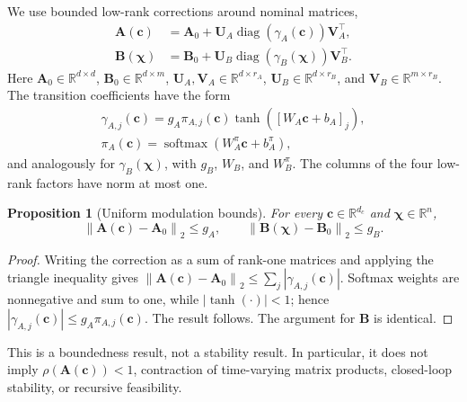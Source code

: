 ﻿\documentclass[journal]{IEEEtran}
\newtheorem{proposition}{Proposition}
\newcommand{\vc}{\mathbf{c}}
\newcommand{\vchi}{\boldsymbol{\chi}}
\newcommand{\mA}{\mathbf{A}}
\newcommand{\mB}{\mathbf{B}}
\newcommand{\mU}{\mathbf{U}}
\newcommand{\mV}{\mathbf{V}}
\newcommand{\R}{\mathbb{R}}
\newcommand{\norm}[1]{\left\lVert #1\right\rVert}
\begin{document}
We use bounded low-rank corrections around nominal matrices,
\begin{align}
    \mA(\vc)&=\mA_0+\mU_A\operatorname{diag}(\gamma_A(\vc))\mV_A^\top,\\
    \mB(\vchi)&=\mB_0+\mU_B\operatorname{diag}(\gamma_B(\vchi))\mV_B^\top.
    \label{eq:low_rank_schedules}
\end{align}
Here $\mA_0\in\R^{d\times d}$, $\mB_0\in\R^{d\times m}$, $\mU_A,\mV_A\in\R^{d\times r_A}$, $\mU_B\in\R^{d\times r_B}$, and $\mV_B\in\R^{m\times r_B}$. The transition coefficients have the form
\begin{equation}
    \begin{gathered}
    \gamma_{A,j}(\vc)=g_A\pi_{A,j}(\vc)\tanh([W_A\vc+b_A]_j),
    \\
    \pi_A(\vc)=\operatorname{softmax}(W_A^\pi\vc+b_A^\pi),
    \end{gathered}
    \label{eq:A_modulation}
\end{equation}
and analogously for $\gamma_B(\vchi)$, with $g_B$, $W_B$, and $W_B^\pi$. The columns of the four low-rank factors have norm at most one.

\begin{proposition}[Uniform modulation bounds]
\label{prop:modulation_bound}
For every $\vc\in\R^{d_c}$ and $\vchi\in\R^n$,
\begin{equation}
    \norm{\mA(\vc)-\mA_0}_2\le g_A,
    \qquad
    \norm{\mB(\vchi)-\mB_0}_2\le g_B.
    \label{eq:modulation_bound}
\end{equation}
\end{proposition}
\begin{proof}
Writing the correction as a sum of rank-one matrices and applying the triangle inequality gives
$\norm{\mA(\vc)-\mA_0}_2\le\sum_j|\gamma_{A,j}(\vc)|$. Softmax weights are nonnegative and sum to one, while $|\tanh(\cdot)|<1$; hence $|\gamma_{A,j}(\vc)|\le g_A\pi_{A,j}(\vc)$. The result follows. The argument for $\mB$ is identical.
\end{proof}

This is a boundedness result, not a stability result. In particular, it does not imply $\rho(\mA(\vc))<1$, contraction of time-varying matrix products, closed-loop stability, or recursive feasibility.
\end{document}
